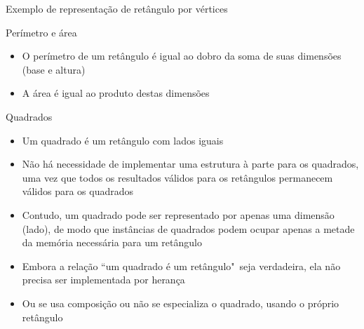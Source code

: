 \begin{frame}[fragile]{Exemplo de representação de retângulo por vértices}
\end{frame}

\begin{frame}[fragile]{Perímetro e área}

    \begin{itemize}
        \item O perímetro de um retângulo é igual ao dobro da soma de suas dimensões 
            (base e altura)
        \pause

        \item A área é igual ao produto destas dimensões
    \end{itemize}
        \pause

\end{frame}

\begin{frame}[fragile]{Quadrados}

    \begin{itemize}
        \item Um quadrado é um retângulo com lados iguais
        \pause

        \item Não há necessidade de implementar uma estrutura à parte para os quadrados, 
            uma vez que todos os resultados válidos para os retângulos permanecem válidos para os 
            quadrados
        \pause

        \item Contudo, um quadrado pode ser representado por apenas uma dimensão (lado), de modo
            que instâncias de quadrados podem ocupar apenas a metade da memória necessária
            para um retângulo
        \pause

        \item Embora a relação ``um quadrado é um retângulo"\ seja verdadeira, ela não precisa
            ser implementada por herança
        \pause

        \item Ou se usa composição ou não se especializa o quadrado, usando o próprio retângulo
    \end{itemize}

\end{frame}

